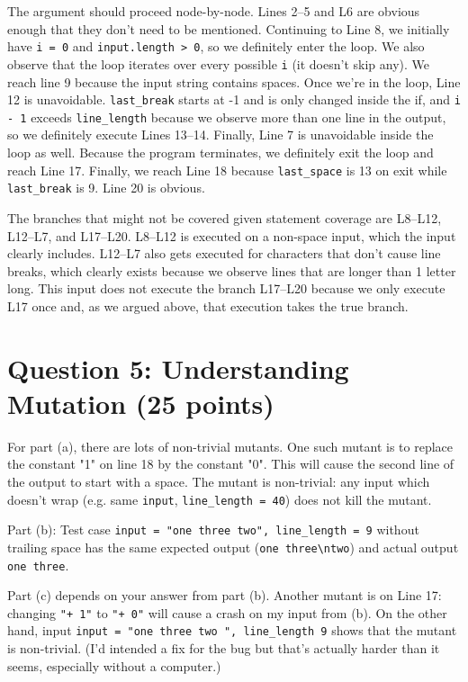 \documentclass[12pt]{article}
\begin{document}
The argument should proceed node-by-node. Lines 2--5 and L6 are obvious enough
that they don't need to be mentioned. Continuing to Line 8, we initially have 
{\tt i = 0} and \verb+input.length > 0+, so we definitely enter the loop.
We also observe that the loop iterates over every possible {\tt i} (it doesn't skip any).
We reach line 9 because the input string contains spaces. Once we're in the loop,
Line 12 is unavoidable. \verb+last_break+ starts at -1 and is only changed inside the
if, and {\tt i - 1} exceeds \verb+line_length+ because we observe more than
one line in the output, so we definitely execute Lines 13--14.
Finally, Line 7 is unavoidable inside the loop as well. Because the program
terminates, we definitely exit the loop and reach Line 17. Finally,
we reach Line 18 because \verb+last_space+ is 13 on exit while \verb+last_break+ is 9.
Line 20 is obvious.

The branches that might not be covered given statement coverage are L8--L12, L12--L7, and L17--L20.
L8--L12 is executed on a non-space input, which the input clearly includes.
L12--L7 also gets executed for characters that don't cause line breaks, which
clearly exists because we observe lines that are longer than 1 letter long.
This input does not execute the branch L17--L20 because we only execute L17 once
and, as we argued above, that execution takes the true branch.

\newpage
\section*{Question 5: Understanding Mutation (25 points)}
For part (a), there are lots of non-trivial mutants. One such mutant is to replace
the constant "1" on line 18 by the constant "0".
This will cause the second line of the output to start with a space.
The mutant is non-trivial: any input which doesn't wrap (e.g. same {\tt input},
\verb+line_length = 40+) does not kill the mutant.

Part (b): Test case \verb+input = "one three two", line_length = 9+ 
without trailing space has the same expected output (\verb+one three\ntwo+)
and actual output \verb+one three+.

Part (c) depends on your answer from part (b).
Another mutant is on Line 17: changing \verb!"+ 1"! to 
\verb!"+ 0"! will cause a crash on my input from (b).
On the other hand, input \verb+input = "one three two ", line_length 9+ shows
that the mutant is non-trivial. (I'd intended a fix for the 
bug but that's actually harder than it seems, especially
without a computer.)

\end{document}
